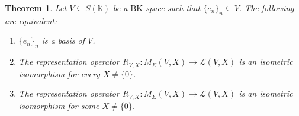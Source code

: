 \documentclass[14pt, a4paper]{article}  %
\newcommand{\K}{\mathbb{K}}
\newcommand{\BK}{\text{BK}}
\newtheorem{theorem}{Theorem}[section]
\begin{document}
\begin{theorem}\label{d272_2} \label{d250_4} \label{d236_4}\label{efren14_z} \label{efren15_0_z}
	Let $V \subseteq S(\K)$ be a $\BK$-space such that $\{e_{n}\}_{n} \subseteq V$. The following are equivalent:
	\begin{enumerate}
		\item[i.] $\{e_{n}\}_{n}$ is a basis of $V$.
		\item[ii.] The representation operator $R_{V,X}: M_{\Sigma}(V, X) \to \mathcal{L}(V, X)$ is an isometric isomorphism for every $X \neq \{0\}$.
		\item[iii.] The representation operator $R_{V,X}: M_{\Sigma}(V, X) \to \mathcal{L}(V, X)$ is an isometric isomorphism for some $X \neq \{0\}$.
	\end{enumerate}  
\end{theorem} 
\end{document}
